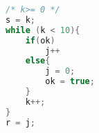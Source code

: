\begin{lstlisting}[language=Java,firstnumber=1]
/* k>= 0 */
s = k;
while (k < 10){
	if(ok)
		j++
	else{
		j = 0;
		ok = true;
	}
	k++;
}
r = j;
\end{lstlisting}